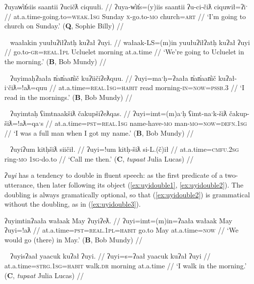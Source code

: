\ex \label{ex:uyin}
\begingl
\glpreamble ʔuyaw̓it̓siis saantii ʔucičƛ ciquułi. //
\gla ʔuya-w̓it̓s=(y)iis saantii ʔu-ci-čiƛ ciquwił=ʔiˑ //
\glb at.a.time-going.to=\textsc{weak.1sg} Sunday \textsc{x}-go.to-\textsc{mo} church=\textsc{art} //
\glft `I'm going to church on Sunday.' (\textbf{Q}, Sophie Billy) //
\endgl
\xe

\ex~ \label{ex:uyiobj}
\begingl
\glpreamble waałakin yuułuʔiłʔatḥ kuʔał ʔuyi. //
\gla wałaak-LS=(m)in yuułuʔiłʔatḥ kuʔał ʔuyi //
\glb go.to-\textsc{gr}=\textsc{real.1pl} Ucluelet morning at.a.time //
\glft `We're going to Ucluelet in the morning.' (\textbf{B}, Bob Mundy) //
\endgl
\xe

\ex~ \label{ex:uyipssb}
\begingl
\glpreamble ʔuyimaḥʔaała n̓an̓aan̓ič kuʔiičiʔeƛquu. //
\gla ʔuyi=maˑḥ=ʔaała n̓an̓aan̓ič kuʔał-iˑčiƛ=!aƛ=quu //
\glb at.a.time=\textsc{real.1sg}=\textsc{habit} read morning-\textsc{in}=\textsc{now}=\textsc{pssb.3} //
\glft `I read in the mornings.' (\textbf{B}, Bob Mundy) //
\endgl
\xe

\ex~ \label{ex:uyidef}
\begingl
\glpreamble ʔuyimtaḥ ʕimtnaakšiƛ čakupšiʔeƛqas. //
\gla ʔuyi=imt=(m)aˑḥ ʕimt-naˑk-šiƛ čakup-šiƛ=!aƛ=qaˑs //
\glb at.a.time=\textsc{pst}=\textsc{real.1sg} name-have-\textsc{mo} man-\textsc{mo}=\textsc{now}=\textsc{defn.1sg} //
\glft `I was a full man when I got my name.' (\textbf{B}, Bob Mundy) //
\endgl
\xe

\ex~ \label{ex:uyidrop}
\begingl
\glpreamble ʔuyiʔum kitḥšiƛ siičił. //
\gla ʔuyi=!um kitḥ-šiƛ si-L.(č)ił //
\glb at.a.time=\textsc{cmfu.2sg} ring-\textsc{mo} \textsc{1sg}-do.to //
\glft `Call me then.' (\textbf{C}, \textit{tupaat} Julia Lucas) //
\endgl
\xe

\textit{ʔuyi} has a tendency to double in fluent speech: as the first predicate of a two-utterance, then later following its object (\ref{ex:uyidouble1}, \ref{ex:uyidouble2}). The doubling is always gramatically optional, so that (\ref{ex:uyidouble2}) is grammatical without the doubling, as in (\ref{ex:uyidouble3}).

\ex \label{ex:uyidouble1}
\begingl
\glpreamble ʔuyimtinʔaała wałaak May ʔuyiʔeƛ. //
\gla ʔuyi=imt=(m)in=ʔaała wałaak May ʔuyi=!aƛ //
\glb at.a.time=\textsc{pst}=\textsc{real.1pl}=\textsc{habit} go.to May at.a.time=\textsc{now} //
\glft `We would go (there) in May.' (\textbf{B}, Bob Mundy) //
\endgl
\xe

\ex~ \label{ex:uyidouble2}
\begingl
\glpreamble ʔuyisʔaał yaacuk kuʔał ʔuyi. //
\gla ʔuyi=s=ʔaał yaacuk kuʔał ʔuyi //
\glb at.a.time=\textsc{strg.1sg}=\textsc{habit} walk.\textsc{dr} morning at.a.time //
\glft `I walk in the morning.' (\textbf{C}, \textit{tupaat} Julia Lucas) //
\endgl
\xe

